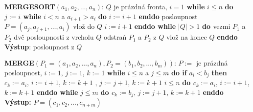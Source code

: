 {\bf MERGESORT$(a_1,a_2,\dots,a_n)$}:\newline 
$Q$ je pr\'azdn\'a fronta, $i=1$\newline 
{\bf while} $i\le n$ {\bf do\newline 
\phantom{{\rm ---}}$j:=i$\newline 
\phantom{{\rm ---}}while} $i<n$ a $a_{i+1}>a_i$ {\bf do} $i:=i+1$ {\bf enddo\newline 
\phantom{{\rm ---}}}posloupnost $P=(a_j,a_{j+1},\dots,a_i)$ vlo\v z do $
Q$\newline 
\phantom{---}$i:=i+1$\newline 
{\bf enddo\newline 
while} $|Q|>1$ {\bf do\newline 
\phantom{{\rm ---}}$ $}vezmi $P_1$ a $P_2$ dv\v e posloupnosti z vrcholu $
Q$\newline 
\phantom{---}odstra\v n $P_1$ a $P_2$ z $Q$\newline 
\phantom{---}{\bf MERGE$(P_1,P_2)$} vlo\v z na konec $Q$\newline 
{\bf enddo\newline 
V\'ystup}: posloupnost z $Q$
\bigskip

{\bf MERGE$(P_1=(a_1,a_2,\dots,a_n),P_2=(b_1,b_2,\dots,b_m))$}:\newline 
$P:=$ je pr\'azdn\'a posloupnost, $i:=1$, $j:=1$, $k:=1$\newline 
{\bf while} $i\le n$ a $j\le m$ {\bf do\newline 
\phantom{{\rm ---}}if} $a_i<b_j$ {\bf then\newline 
\phantom{{\rm ------}}$c_k:=a_i$}, $i:=i+1$, $k:=k+1$\newline 
{}, $j:=j+1$, $k:=k+1$\newline 
\phantom{---}{\bf endif\newline 
enddo\newline 
while} $i\le n$ {\bf do\newline 
\phantom{{\rm ---}}$c_k:=a_i$}, $i:=i+1$, $k:=k+1$\newline 
{\bf enddo\newline 
while} $j\le m$ {\bf do\newline 
\phantom{{\rm ---}}$c_k:=b_j$}, $j:=j+1$, $k:=k+1$\newline 
{\bf enddo\newline 
V\'ystup:} $P=(c_1,c_2,\dots,c_{n+m})$
\bigskip

